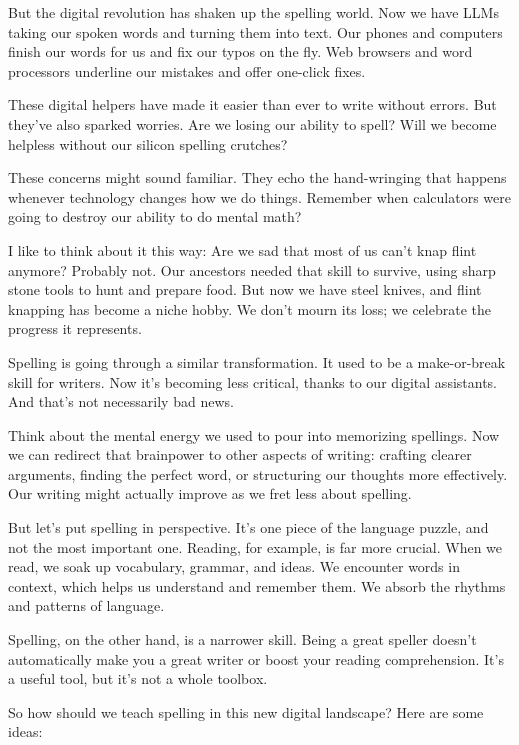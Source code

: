 But the digital revolution has shaken up the spelling world. Now we have LLMs taking our spoken words and turning them into text. Our phones and computers finish our words for us and fix our typos on the fly. Web browsers and word processors underline our mistakes and offer one-click fixes.

These digital helpers have made it easier than ever to write without errors. But they've also sparked worries. Are we losing our ability to spell? Will we become helpless without our silicon spelling crutches?

These concerns might sound familiar. They echo the hand-wringing that happens whenever technology changes how we do things. Remember when calculators were going to destroy our ability to do mental math?

I like to think about it this way: Are we sad that most of us can't knap flint anymore? Probably not. Our ancestors needed that skill to survive, using sharp stone tools to hunt and prepare food. But now we have steel knives, and flint knapping has become a niche hobby. We don't mourn its loss; we celebrate the progress it represents.

Spelling is going through a similar transformation. It used to be a make-or-break skill for writers. Now it's becoming less critical, thanks to our digital assistants. And that's not necessarily bad news.

Think about the mental energy we used to pour into memorizing spellings. Now we can redirect that brainpower to other aspects of writing: crafting clearer arguments, finding the perfect word, or structuring our thoughts more effectively. Our writing might actually improve as we fret less about spelling.

But let's put spelling in perspective. It's one piece of the language puzzle, and not the most important one. Reading, for example, is far more crucial. When we read, we soak up vocabulary, grammar, and ideas. We encounter words in context, which helps us understand and remember them. We absorb the rhythms and patterns of language.

Spelling, on the other hand, is a narrower skill. Being a great speller doesn't automatically make you a great writer or boost your reading comprehension. It's a useful tool, but it's not a whole toolbox.

So how should we teach spelling in this new digital landscape? Here are some ideas:

